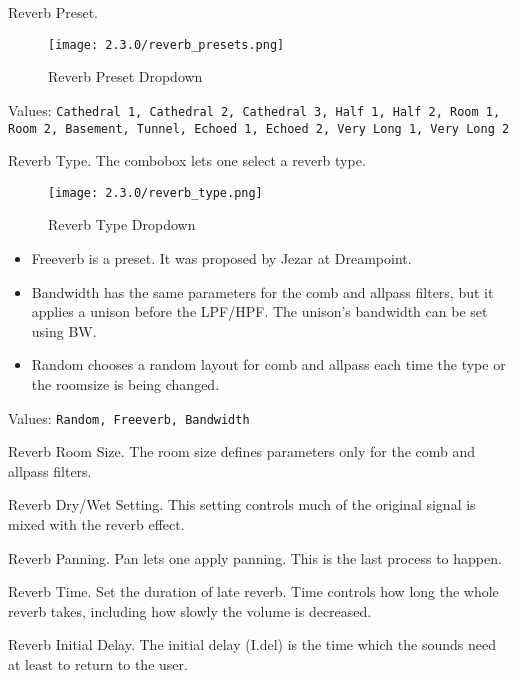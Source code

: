       Reverb Preset.

\begin{figure}[H]
   \centering
   \texttt{[image: 2.3.0/reverb\_presets.png]}
   \caption{Reverb Preset Dropdown}
   \label{fig:reverb_preset_dropdown}
\end{figure}

   Values: \texttt{Cathedral 1, Cathedral 2, Cathedral 3, Half 1, Half 2,
              Room 1, Room 2, Basement, Tunnel, Echoed 1, Echoed 2, Very Long
               1, Very Long 2}

   Reverb Type.
   The combobox lets one select a reverb type.

\begin{figure}[H]
   \centering
   \texttt{[image: 2.3.0/reverb\_type.png]}
   \caption{Reverb Type Dropdown}
   \label{fig:reverb_type_dropdown}
\end{figure}

   \begin{itemize}
      \item Freeverb is a preset. It was proposed by Jezar at Dreampoint.
      \item Bandwidth has the same parameters for the comb and allpass
         filters, but it applies a unison before the LPF/HPF. The unison’s
         bandwidth can be set using BW.
      \item Random chooses a random layout for comb and allpass each time the
         type or the roomsize is being changed.
   \end{itemize}

   Values: \texttt{Random, Freeverb, Bandwidth}

   Reverb Room Size.
   The room size defines parameters only for the comb and allpass filters.

   Reverb Dry/Wet Setting.
   This setting controls much of the original signal is mixed with the
   reverb effect.

   Reverb Panning.
   Pan lets one apply panning. This is the last process to happen.

   Reverb Time.
   Set the duration of late reverb.
   Time controls how long the whole reverb takes, including how slowly
   the volume is decreased.

   Reverb Initial Delay.
   The initial delay (I.del) is the time which the sounds need at least to
   return to the user.

